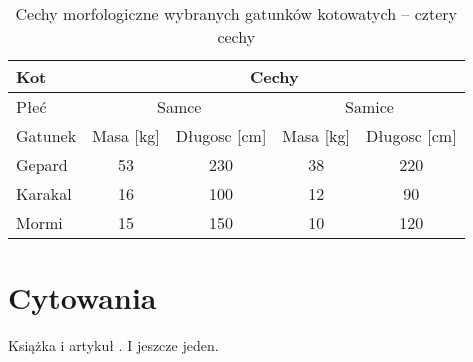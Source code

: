 \documentclass{article}
\begin{document}
    \begin{table}[h!]
        \caption[Cechy morfologiczne kotowatych]{
            \label{tab.kotki}    
            Cechy morfologiczne wybranych gatunków kotowatych – cztery cechy
        }
        \centering
        \begin{tabular}{||l|c|c|c|c||}
            \hline\hline
            Kot & \multicolumn{4}{c|}{Cechy} \\ \hline
            Płeć & \multicolumn{2}{c|}{Samce} & \multicolumn{2}{c|}{Samice} \\ \hline
            Gatunek & Masa [kg] & Długosc [cm] & Masa [kg] & Długosc [cm] \\ \hline \hline
            Gepard & 53 & 230 & 38 & 220 \\ \hline
            Karakal & 16 & 100 & 12 & 90 \\ \hline
            Mormi & 15 & 150 & 10 & 120 \\ \hline\hline
        \end{tabular}
    \end{table}

\section{Cytowania}

Książka \cite{82_Ballard} i artykuł \cite{Lukac2005}.
I jeszcze jeden\cite{Bator2008}.


 
\end{document}
